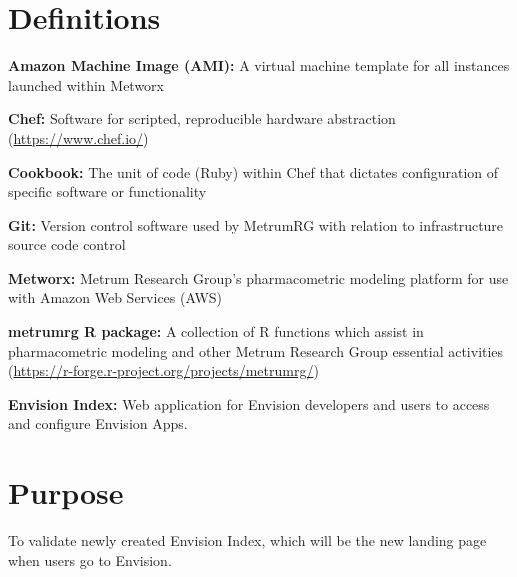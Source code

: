 \documentclass[]{article}
\begin{document}
\newpage



\section{Definitions}\label{definitions}

\textbf{Amazon Machine Image (AMI):} A virtual machine template for all
instances launched within Metworx

\textbf{Chef:} Software for scripted, reproducible hardware abstraction
(\url{https://www.chef.io/})

\textbf{Cookbook:} The unit of code (Ruby) within Chef that dictates
configuration of specific software or functionality

\textbf{Git:} Version control software used by MetrumRG with relation to
infrastructure source code control

\textbf{Metworx:} Metrum Research Group's pharmacometric modeling
platform for use with Amazon Web Services (AWS)

\textbf{metrumrg R package:} A collection of R functions which assist in
pharmacometric modeling and other Metrum Research Group essential
activities (\url{https://r-forge.r-project.org/projects/metrumrg/})

\textbf{Envision Index:} Web application for Envision developers and
users to access and configure Envision Apps.

\section{Purpose}\label{purpose}

To validate newly created Envision Index, which will be the new landing
page when users go to Envision. \vspace{1cm}
\end{document}
